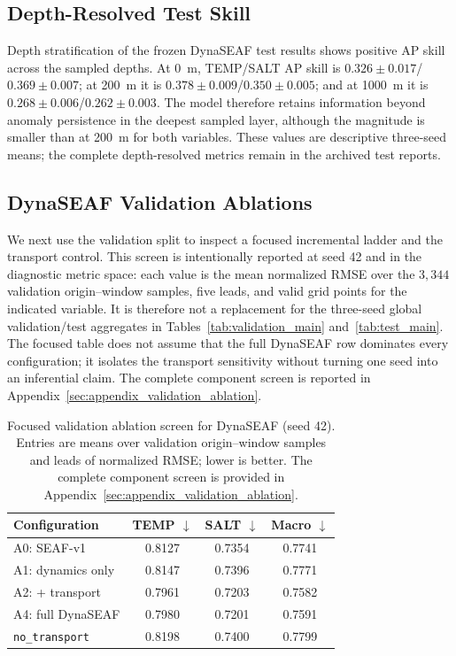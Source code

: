 \documentclass[conference]{IEEEtran}
\begin{document}
\subsection{Depth-Resolved Test Skill}
Depth stratification of the frozen DynaSEAF test results shows positive AP skill across the sampled depths. At 0~m, TEMP/SALT AP skill is $0.326\pm0.017$/$0.369\pm0.007$; at 200~m it is $0.378\pm0.009$/$0.350\pm0.005$; and at 1000~m it is $0.268\pm0.006$/$0.262\pm0.003$. The model therefore retains information beyond anomaly persistence in the deepest sampled layer, although the magnitude is smaller than at 200~m for both variables. These values are descriptive three-seed means; the complete depth-resolved metrics remain in the archived test reports.

\subsection{DynaSEAF Validation Ablations}
We next use the validation split to inspect a focused incremental ladder and the transport control. This screen is intentionally reported at seed 42 and in the diagnostic metric space: each value is the mean normalized RMSE over the $3{,}344$ validation origin--window samples, five leads, and valid grid points for the indicated variable. It is therefore not a replacement for the three-seed global validation/test aggregates in Tables~\ref{tab:validation_main} and~\ref{tab:test_main}. The focused table does not assume that the full DynaSEAF row dominates every configuration; it isolates the transport sensitivity without turning one seed into an inferential claim. The complete component screen is reported in Appendix~\ref{sec:appendix_validation_ablation}.

\begin{table}[!t]
\centering
\caption{Focused validation ablation screen for DynaSEAF (seed 42). Entries are means over validation origin--window samples and leads of normalized RMSE; lower is better. The complete component screen is provided in Appendix~\ref{sec:appendix_validation_ablation}.}
\label{tab:dynaseaf_ablations}
\scriptsize
\setlength{\tabcolsep}{3.0pt}
\renewcommand{\arraystretch}{1.05}
\begin{tabular}{lccc}
\toprule
Configuration & TEMP $\downarrow$ & SALT $\downarrow$ & Macro $\downarrow$\\
\midrule
A0: SEAF-v1 & 0.8127 & 0.7354 & 0.7741\\
A1: dynamics only & 0.8147 & 0.7396 & 0.7771\\
A2: + transport & 0.7961 & 0.7203 & 0.7582\\
A4: full DynaSEAF & 0.7980 & 0.7201 & 0.7591\\
\texttt{no\_transport} & 0.8198 & 0.7400 & 0.7799\\
\bottomrule
\end{tabular}
\end{table}
\end{document}
